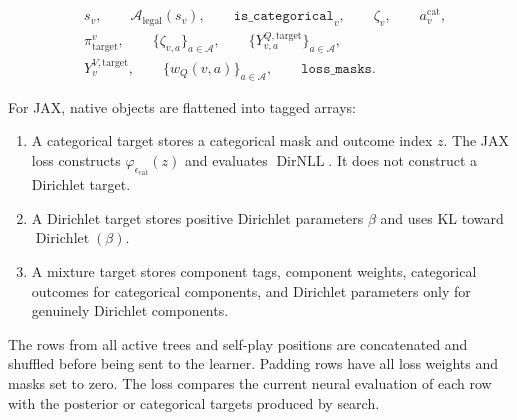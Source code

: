 \documentclass[11pt]{article}
\newcommand{\Dir}{\operatorname{Dirichlet}}
\newcommand{\Actions}{\mathcal{A}}
\newcommand{\Legal}{\mathcal{A}_{\mathrm{legal}}}
\newcommand{\CatPoint}{\varphi_{\epsilon_{\mathrm{cat}}}}
\newcommand{\DirNLL}{\operatorname{DirNLL}}
\begin{document}
\[
\begin{aligned}
&s_v,
\qquad
\Legal(s_v),
\qquad
\texttt{is\_categorical}_v,
\qquad
\zeta_v,
\qquad
 a_v^{\mathrm{cat}},\\
&\pi_{\mathrm{target}}^v,
\qquad
\{\zeta_{v,a}\}_{a\in\Actions},
\qquad
\{Y^{Q,\mathrm{target}}_{v,a}\}_{a\in\Actions},\\
&Y^{V,\mathrm{target}}_v,
\qquad
\{w_Q(v,a)\}_{a\in\Actions},
\qquad
\texttt{loss\_masks}.
\end{aligned}
\]

For JAX, native objects are flattened into tagged arrays:

\begin{enumerate}[leftmargin=2em]
  \item A categorical target stores a categorical mask and outcome index
  \(z\). The JAX loss constructs \(\CatPoint(z)\) and evaluates
  \(\DirNLL\). It does not construct a Dirichlet target.

  \item A Dirichlet target stores positive Dirichlet parameters \(\beta\) and
  uses KL toward \(\Dir(\beta)\).

  \item A mixture target stores component tags, component weights, categorical
  outcomes for categorical components, and Dirichlet parameters only for
  genuinely Dirichlet components.
\end{enumerate}

The rows from all active trees and self-play positions are concatenated and
shuffled before being sent to the learner. Padding rows have all loss weights
and masks set to zero. The loss compares the current neural evaluation of each
row with the posterior or categorical targets produced by search.
\end{document}
